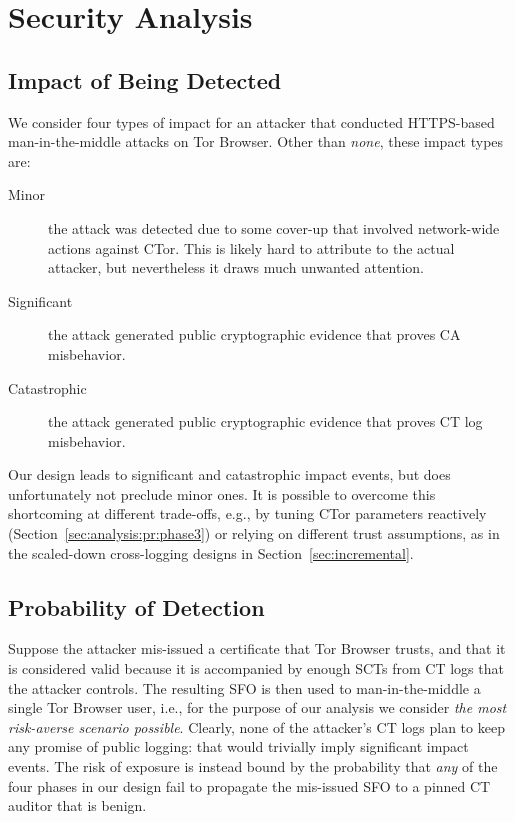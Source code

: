 \section{Security Analysis} \label{sec:analysis}

\subsection{Impact of Being Detected} \label{sec:analysis:impact}
We consider four types of impact for an attacker that conducted
HTTPS-based man-in-the-middle attacks on Tor Browser.  Other than \emph{none},
these impact types are:
\begin{description}
	\item[Minor] the attack was detected due to some cover-up that involved
		network-wide actions against CTor.  This is likely hard to attribute to
		the actual attacker, but nevertheless it draws much unwanted attention.
	\item[Significant] the attack generated public cryptographic evidence
		that proves CA misbehavior.
	\item[Catastrophic] the attack generated public cryptographic evidence
		that proves CT log misbehavior.
\end{description}

Our design leads to significant and catastrophic impact events, but does
unfortunately not preclude minor ones.  It is possible to overcome this
shortcoming at different trade-offs, e.g., by tuning CTor parameters reactively
(Section~\ref{sec:analysis:pr:phase3}) or relying on different trust
assumptions, as in the scaled-down cross-logging designs in
Section~\ref{sec:incremental}.

\subsection{Probability of Detection} \label{sec:analysis:pr}
Suppose the attacker mis-issued a certificate that Tor Browser trusts, and that
it is considered valid because it is accompanied by enough SCTs from CT logs
that the attacker controls.  The resulting SFO is then used to man-in-the-middle
a single Tor Browser user, i.e., for the purpose of our analysis we consider
\emph{the most risk-averse scenario possible}.  Clearly, none of the attacker's
CT logs plan to keep any promise of public logging:
	that would trivially imply significant impact events.
The risk of exposure is instead bound by the probability that \emph{any} of the
four phases in our design fail to propagate the mis-issued SFO to a pinned CT
auditor that is benign.

